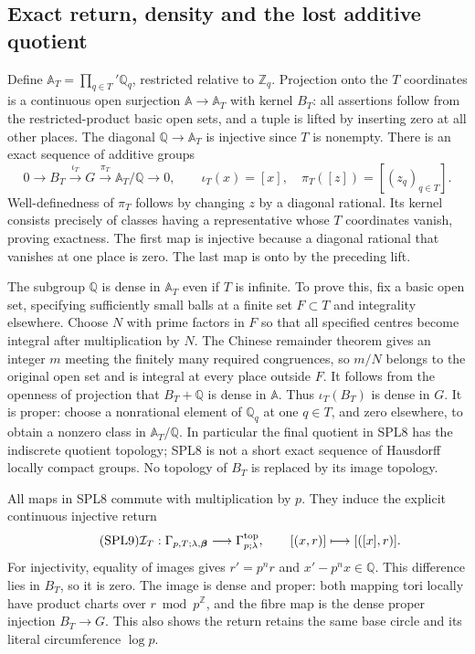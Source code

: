 \subsection{Exact return, density and the lost additive quotient}

Define $\mathbb A_T=\prod_{q\in T}'\mathbb Q_q$, restricted relative
to $\mathbb Z_q$. Projection onto the $T$ coordinates is a continuous
open surjection $\mathbb A\to\mathbb A_T$ with kernel $B_T$:
all assertions follow from the restricted-product basic open sets,
and a tuple is lifted by inserting zero at all other places.
The diagonal $\mathbb Q\to\mathbb A_T$ is injective since $T$ is
nonempty. There is an exact sequence of additive groups
\begin{equation}\tag{SPL8}
0\longrightarrow B_T\xrightarrow{\iota_T}G
\xrightarrow{\pi_T}\mathbb A_T/\mathbb Q\longrightarrow0,
\qquad\iota_T(x)=[x],\quad\pi_T([z])=[(z_q)_{q\in T}].
\end{equation}
Well-definedness of $\pi_T$ follows by changing $z$ by a diagonal
rational. Its kernel consists precisely of classes having a
representative whose $T$ coordinates vanish, proving exactness.
The first map is injective because a diagonal rational that vanishes
at one place is zero. The last map is onto by the preceding lift.

The subgroup $\mathbb Q$ is dense in $\mathbb A_T$ even if $T$ is
infinite. To prove this, fix a basic open set, specifying sufficiently
small balls at a finite set $F\subset T$ and integrality elsewhere.
Choose $N$ with prime factors in $F$ so that all specified centres
become integral after multiplication by $N$. The Chinese remainder
theorem gives an integer $m$ meeting the finitely many required
congruences, so $m/N$ belongs to the original open set and is integral
at every place outside $F$. It follows from the openness of projection
that $B_T+\mathbb Q$ is dense in $\mathbb A$. Thus $\iota_T(B_T)$
is dense in $G$. It is proper: choose a nonrational element of
$\mathbb Q_q$ at one $q\in T$, and zero elsewhere, to obtain a
nonzero class in $\mathbb A_T/\mathbb Q$.
In particular the final quotient in SPL8 has the indiscrete quotient
topology; SPL8 is not a short exact sequence of Hausdorff locally
compact groups. No topology of $B_T$ is replaced by its image topology.

All maps in SPL8 commute with multiplication by $p$. They induce the
explicit continuous injective return
\begin{equation}\tag{SPL9}
\mathcal I_T:\Gamma_{p,T;\lambda,\boldsymbol\beta}
\longrightarrow\Gamma_{p;\lambda}^{\rm top},
\qquad[(x,r)]\longmapsto[([x],r)].
\end{equation}
For injectivity, equality of images gives $r'=p^n r$ and
$x'-p^n x\in\mathbb Q$. This difference lies in $B_T$, so it is
zero. The image is dense and proper: both mapping tori locally have
product charts over $r\bmod p^{\mathbb Z}$, and the fibre map is
the dense proper injection $B_T\to G$. This also shows the return
retains the same base circle and its literal circumference $\log p$.

